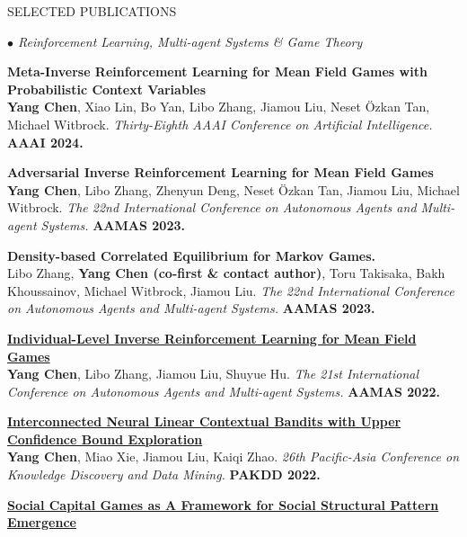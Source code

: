 \documentclass{resume} %
\begin{document}
\begin{rSection}{SELECTED PUBLICATIONS}
\begin{rSubsection}{\large\em $\bullet$ Reinforcement Learning, Multi-agent Systems \& Game Theory}{}{}{}
	\item {\bf Meta-Inverse Reinforcement Learning for Mean Field Games with Probabilistic Context Variables}\\
		\textbf{Yang Chen}, Xiao Lin, Bo Yan, Libo Zhang, Jiamou Liu, Neset \"{O}zkan Tan, Michael Witbrock. {\em Thirty-Eighth AAAI Conference on Artificial Intelligence.} \textbf{AAAI 2024.} \\
	\item {\bf Adversarial Inverse Reinforcement Learning for Mean Field Games}\\
		\textbf{Yang Chen}, Libo Zhang, Zhenyun Deng, Neset \"{O}zkan Tan, Jiamou Liu, Michael Witbrock. {\em The 22nd International Conference on Autonomous Agents and Multi-agent Systems.} \textbf{AAMAS 2023.}\\
	\item {\bf Density-based Correlated Equilibrium for Markov Games.}\\
		Libo Zhang, \textbf{Yang Chen (co-first \& contact author)}, Toru Takisaka, Bakh Khoussainov, Michael Witbrock, Jiamou Liu. {\em The 22nd International Conference on Autonomous Agents and Multi-agent Systems.} \textbf{AAMAS 2023.}\\
	\item {\href{https://ifaamas.org/Proceedings/aamas2022/pdfs/p253.pdf}{\bf Individual-Level Inverse Reinforcement Learning for Mean Field Games}}\\
		\textbf{Yang Chen}, Libo Zhang, Jiamou Liu, Shuyue Hu. {\em The 21st International Conference on Autonomous Agents and Multi-agent Systems.} \textbf{AAMAS 2022.}\\
	\item {\href{}{\bf  Interconnected Neural Linear Contextual Bandits with Upper Confidence Bound Exploration}}\\
		\textbf{Yang Chen}, Miao Xie, Jiamou Liu, Kaiqi Zhao. {\em 26th Pacific-Asia Conference on Knowledge Discovery and Data Mining.} \textbf{PAKDD 2022.}\\
	\item {\href{http://www.ifaamas.org/Proceedings/aamas2020/pdfs/p1807.pdf}{\bf Social Capital Games as A Framework for Social Structural Pattern Emergence}}\\ 

\end{rSubsection}
\end{rSection}
\end{document}
